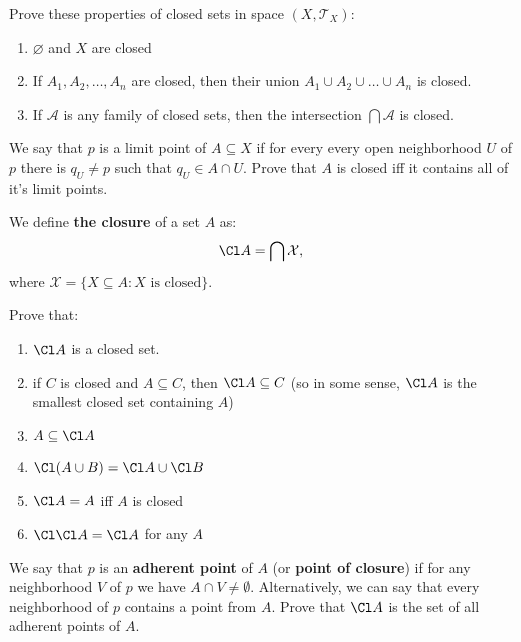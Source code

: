 \begin{prob}
  Prove these properties of closed sets in space $(X, \mathcal T_X)$:
  \begin{enumerate}
    \item $\varnothing$ and  $X$ are closed
    \item If $A_1, A_2,\dots, A_n$ are closed, then their
      union $A_1\cup A_2\cup\dots\cup A_n$ is closed.
    \item If $\mathcal A$ is any family of
      closed sets, then the intersection $\bigcap \mathcal A$ is
      closed.
  \end{enumerate}
\end{prob}

\begin{prob}
  We say that $p$ is a limit point of $A\subseteq X$ if for every every open neighborhood $U$ of $p$ there is $q_U\neq p$ such that
  $q_U\in A\cap U$. Prove that $A$ is closed iff it contains all
  of it's limit points.
\end{prob}

\noindent We define \textbf{the closure} of a set $A$ as:
$$\Cl A = \bigcap \mathcal X,$$
where $\mathcal X = \{X\subseteq A : X \text{ is closed} \}$.

\begin{prob}
  Prove that:
  \begin{enumerate}
    \item $\Cl A$ is a closed set.
    \item if $C$ is closed and $A\subseteq C$,
    then $\Cl A\subseteq C$ (so in some sense,
    $\Cl A$ is the smallest closed set containing $A$)
    \item $A\subseteq \Cl A$
    \item $\Cl (A\cup B) = \Cl A \cup \Cl B$
    \item $\Cl A = A$ iff $A$ is closed
    \item $\Cl \Cl A = \Cl A$ for any $A$
  \end{enumerate}
\end{prob}

\begin{prob}
	We say that $p$ is an \textbf{adherent point} of $A$
  (or \textbf{point of closure})
  if for any neighborhood $V$ of $p$ we have
  $A\cap V\neq \emptyset$. Alternatively, we can say that every
  neighborhood of $p$ contains
  a point from $A$. Prove that $\Cl A$ is the set
	of all adherent points of $A$.
\end{prob}

